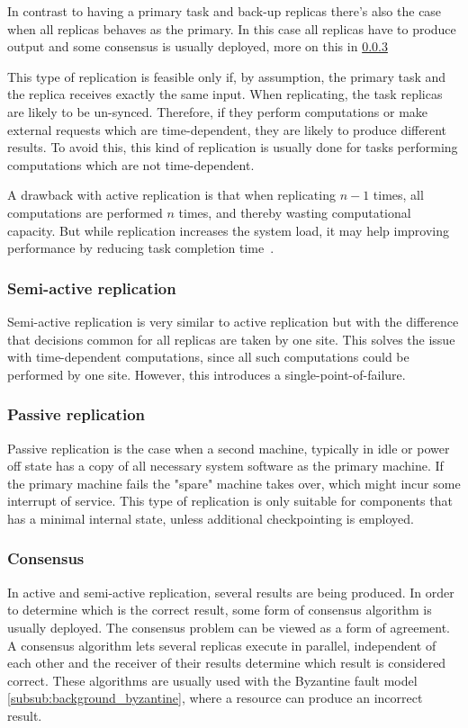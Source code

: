 \documentclass{cslthse-msc}
\begin{document}
In contrast to having a primary task and back-up replicas there's also the case when all replicas behaves as the primary. In this case all replicas have to produce output and some consensus is usually deployed, more on this in \cref{subsub:consensus}

This type of replication is feasible only if, by assumption, the primary task and the replica receives exactly the same input. When replicating, the task replicas are likely to be un-synced. Therefore, if they perform computations or make external requests which are time-dependent, they are likely to produce different results. To avoid this, this kind of replication is usually done for tasks performing computations which are not time-dependent.

A drawback with active replication is that when replicating $n-1$ times, all computations are performed $n$ times, and thereby wasting computational capacity. But while replication increases the system load, it may help improving performance by reducing task completion time~\cite{improvingPerformanceReplication}.

\subsubsection{Semi-active replication} \label{subsec:semi_active_replication}
Semi-active replication is very similar to active replication but with the difference that decisions common for all replicas are taken by one site. This solves the issue with time-dependent computations, since all such computations could be performed by one site. However, this introduces a single-point-of-failure. %

\subsubsection{Passive replication} \label{subsec:passive_replication}
Passive replication is the case when a second machine, typically in idle or power off state has a copy of all necessary system software as the primary machine. If the primary machine fails the "spare" machine takes over, which might incur some interrupt of service. This type of replication is only suitable for components that has a minimal internal state, unless additional checkpointing is employed.

\subsubsection{Consensus} \label{subsub:consensus}
In active and semi-active replication, several results are being produced. In order to determine which is the correct result, some form of consensus algorithm is usually deployed. The consensus problem can be viewed as a form of agreement. A consensus algorithm lets several replicas execute in parallel, independent of each other and the receiver of their results determine which result is considered correct. These algorithms are usually used with the Byzantine fault model \cref{subsub:background_byzantine}, where a resource can produce an incorrect result.
\end{document}
